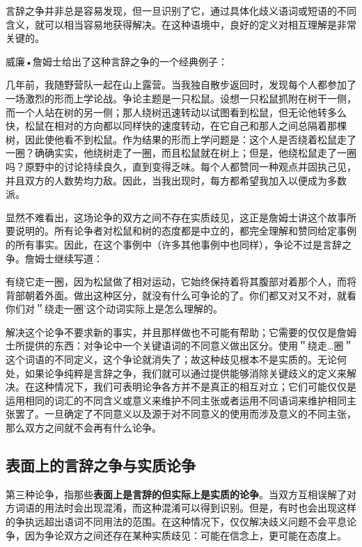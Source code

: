 言辞之争并非总是容易发现，但一旦识别了它，通过具体化歧义语词或短语的不同含义，就可以相当容易地获得解决。在这种语境中，良好的定义对相互理解是非常关键的。

威廉•詹姆士给出了这种言辞之争的一个经典例子：

\begin{displayquote}
几年前，我随野营队一起在山上露营。当我独自散步返回时，发现每个人都参加了一场激烈的形而上学论战。争论主题是一只松鼠。设想一只松鼠抓附在树干一侧，而一个人站在树的另一侧；那人绕树迅速转动以试图看到松鼠，但无论他转多么快，松鼠在相对的方向都以同样快的速度转动，在它自己和那人之间总隔着那棵树，因此使他看不到松鼠。作为结果的形而上学问题是：这个人是否绕着松鼠走了一圈？确确实实，他绕树走了一圈，而且松鼠就在树上；但是，他绕松鼠走了一圈吗？原野中的讨论持续良久，直到变得乏味。每个人都赞同一种观点并固执己见，并且双方的人数势均力敌。因此，当我出现时，每方都希望我加入以便成为多数派。\cite{james1907}
\end{displayquote}

显然不难看出，这场论争的双方之间不存在实质歧见，这正是詹姆士讲这个故事所要说明的。所有论争者对松鼠和树的态度都是中立的，都完全理解和赞同给定事例的所有事实。因此，在这个事例中（许多其他事例中也同样），争论不过是言辞之争。詹姆士继续写道：

\begin{displayquote}
有绕它走一圈，因为松鼠做了相对运动，它始终保持着将其腹部对着那个人，而将背部朝着外面。做出这种区分，就没有什么可争论的了。你们都又对又不对，就看你们对＂绕走一圈'这个动词实际上是怎么理解的。\cite{james1907}
\end{displayquote}

解决这个论争不要求新的事实，并且那样做也不可能有帮助；它需要的仅仅是詹姆士所提供的东西：对争论中一个关键语词的不同意义做出区分。使用＂绕走…圈＂这个词语的不同定义，这个争论就消失了；故这种歧见根本不是实质的。无论何处，如果论争纯粹是言辞之争，我们就可以通过提供能够消除关键歧义的定义来解决。在这种情况下，我们可表明论争各方并不是真正的相互对立；它们可能仅仅是运用相同的词汇的不同含义或意义来维护不同主张或者运用不同语词来维护相同主张罢了。一旦确定了不同意义以及源于对不同意义的使用而涉及意义的不同主张，那么双方之间就不会再有什么论争。\cite{rudin1992}

\subsection{表面上的言辞之争与实质论争}

第三种论争，指那些\textbf{表面上是言辞的但实际上是实质的论争}。当双方互相误解了对方词语的用法时会出现混淆，而这种混淆可以得到识别。但是，有时也会出现这样的争执远超出语词不同用法的范围。在这种情况下，仅仅解决歧义问题不会平息论争，因为争论双方之间还存在某种实质歧见：可能在信念上，更可能在态度上。

